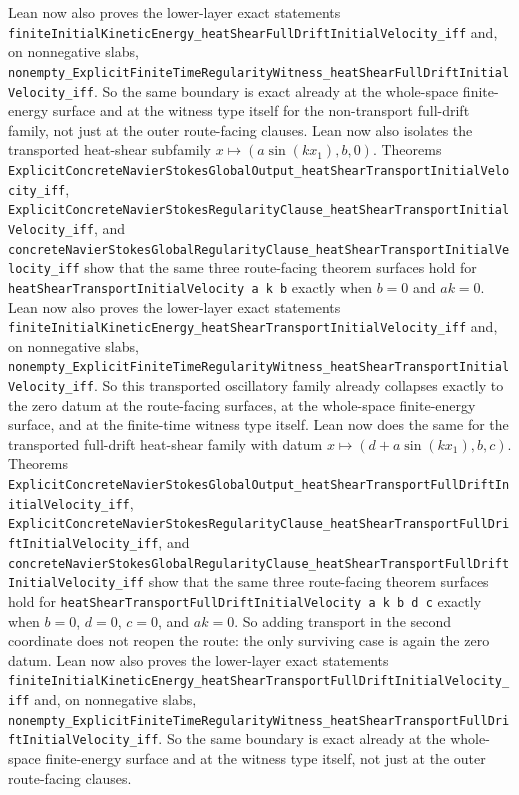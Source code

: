 \documentclass[11pt]{article}
\begin{document}
Lean now also proves the lower-layer exact statements
\texttt{finiteInitialKineticEnergy\_heatShearFullDriftInitialVelocity\_iff}
and, on nonnegative slabs,
\texttt{nonempty\_ExplicitFiniteTimeRegularityWitness\_heatShearFullDriftInitialVelocity\_iff}.
So the same boundary is exact already at the whole-space finite-energy surface
and at the witness type itself for the non-transport full-drift family, not
just at the outer route-facing clauses.
Lean now also isolates the transported heat-shear subfamily
\(x \mapsto (a \sin(k x_1), b, 0)\).  Theorems
\texttt{ExplicitConcreteNavierStokesGlobalOutput\_heatShearTransportInitialVelocity\_iff},
\texttt{ExplicitConcreteNavierStokesRegularityClause\_heatShearTransportInitialVelocity\_iff},
and
\texttt{concreteNavierStokesGlobalRegularityClause\_heatShearTransportInitialVelocity\_iff}
show that the same three route-facing theorem surfaces hold for
\texttt{heatShearTransportInitialVelocity a k b} exactly when
\(b = 0\) and \(a k = 0\).  Lean now also proves the lower-layer exact
statements
\texttt{finiteInitialKineticEnergy\_heatShearTransportInitialVelocity\_iff}
and, on nonnegative slabs,
\texttt{nonempty\_ExplicitFiniteTimeRegularityWitness\_heatShearTransportInitialVelocity\_iff}.
So this transported oscillatory family already collapses exactly to the zero
datum at the route-facing surfaces, at the whole-space finite-energy surface,
and at the finite-time witness type itself.
Lean now does the same for the transported full-drift heat-shear family with
datum \(x \mapsto (d + a \sin(k x_1), b, c)\).  Theorems
\texttt{ExplicitConcreteNavierStokesGlobalOutput\_heatShearTransportFullDriftInitialVelocity\_iff},
\texttt{ExplicitConcreteNavierStokesRegularityClause\_heatShearTransportFullDriftInitialVelocity\_iff},
and
\texttt{concreteNavierStokesGlobalRegularityClause\_heatShearTransportFullDriftInitialVelocity\_iff}
show that the same three route-facing theorem surfaces hold for
\texttt{heatShearTransportFullDriftInitialVelocity a k b d c} exactly when
\(b = 0\), \(d = 0\), \(c = 0\), and \(a k = 0\).  So adding transport in the
second coordinate does not reopen the route: the only surviving case is again
the zero datum.
Lean now also proves the lower-layer exact statements
\texttt{finiteInitialKineticEnergy\_heatShearTransportFullDriftInitialVelocity\_iff}
and, on nonnegative slabs,
\texttt{nonempty\_ExplicitFiniteTimeRegularityWitness\_heatShearTransportFullDriftInitialVelocity\_iff}.
So the same boundary is exact already at the whole-space finite-energy surface
and at the witness type itself, not just at the outer route-facing clauses.
\end{document}
